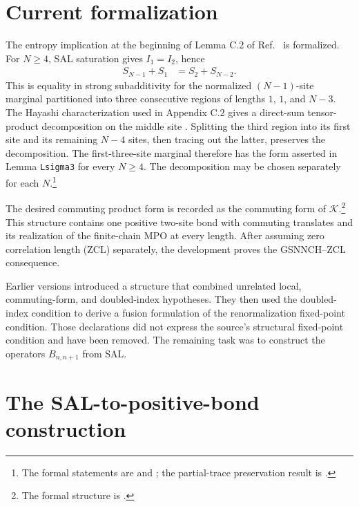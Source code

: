 \documentclass{article}
\begin{document}
\section{Current formalization}

The entropy implication at the beginning of Lemma C.2 of
Ref.~\cite{Cirac2016MPDO_arXiv} is formalized. For $N\geq 4$, SAL saturation
gives $I_1=I_2$, hence
\begin{align}
    S_{N-1}+S_1
        &=S_2+S_{N-2}.
    \label{eq:cpgsv17_mpdo_sal_zcl_eta_local_structure_entropy_equality}
\end{align}
This is equality in strong subadditivity for the normalized $(N-1)$-site
marginal partitioned into three consecutive regions of lengths $1$, $1$, and
$N-3$. The Hayashi characterization used in Appendix C.2 gives a direct-sum
tensor-product decomposition on the middle site
\cite{Cirac2016MPDO_arXiv}. Splitting the third region into its first site and
its remaining $N-4$ sites, then tracing out the latter, preserves the
decomposition. The first-three-site marginal therefore has the form asserted
in Lemma \texttt{Lsigma3} for every $N\geq 4$. The decomposition may be chosen
separately for each $N$.\footnote{The formal statements are
 and
;
the partial-trace preservation result is
.}

The desired commuting product form is recorded as the commuting form of
$\mathcal K$.\footnote{The formal structure is
.} This structure contains one positive
two-site bond with commuting translates and its realization of the finite-chain
MPO at every length. After assuming zero correlation length (ZCL) separately,
the development proves the GSNNCH--ZCL consequence.

Earlier versions introduced a structure that combined unrelated local,
commuting-form, and doubled-index hypotheses. They then used the doubled-index
condition to derive a fusion formulation of the renormalization fixed-point
condition. Those declarations did not express the source's structural
fixed-point condition and have been removed. The remaining task was to
construct the operators $B_{n,n+1}$ from SAL.

\section{The SAL-to-positive-bond construction}
\end{document}

